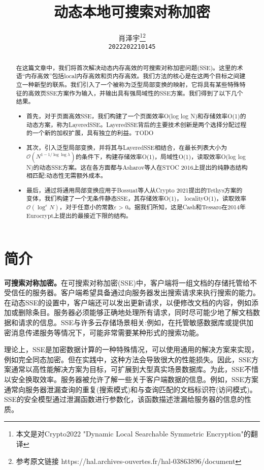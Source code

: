 \documentclass[UTF8]{article}
\title{动态本地可搜索对称加密}
\author{%
  肖泽宇\thanks{本文是对Crypto2022 "Dynamic Local Searchable Symmetric Encryption"的翻译}\thanks{参考原文链接 https://hal.archives-ouvertes.fr/hal-03863896/document} \\
  \texttt{2022202210145} \\
}
\begin{document}
\maketitle


\begin{abstract}
  在这篇文章中，我们将首次解决动态内存高效的可搜索对称加密问题(SSE)。这里的术语“内存高效”包括local内存高效和页内存高效。我们方法的核心是在这两个目标之间建立一种新型的联系。我们引入了一个被称为泛型局部变换的映射，它将具有某些特殊特征的高效页SSE方案作为输入，并输出具有强局域性的SSE方案。我们得到了以下几个结果。
  \begin{itemize}
    \item 首先，对于页面高效SSE，我们构建了一个页面效率O(log log N)和存储效率O(1)的动态方案，称为LayeredSSE。LayeredSSE背后的主要技术创新是两个选择分配过程的一个新的加权扩展，具有独立的利益。TODO
    \item 其次，引入泛型局部变换，并将其与LayeredSSE相结合，在最长列表大小为$\mathcal{O}\left(N^{1-1 / \log \log \lambda}\right)$的条件下，构建存储效率O(1)，局域性O(1)，读取效率O(log log N)的动态SSE方案。这在各方面都与Asharov等人在STOC 2016上提出的纯静态结构相匹配:动态性无需额外成本。
    \item 最后，通过将通用局部变换应用于Bossuat等人从Crypto 2021提出的Tethys方案的变体，我们构建了一个无条件静态SSE，其存储效率O(1)， localityO(1)，读取效率$\mathcal{O}\left(\log ^{\varepsilon} N\right)$，对于任意小的常数$\varepsilon$ > 0。据我们所知，这是Cash和Tessaro在2014年Eurocrypt上提出的最接近下限的结构。
  \end{itemize}
\end{abstract}


\section{简介}
\textbf{可搜索对称加密。}在可搜索对称加密(SSE)中，客户端将一组文档的存储托管给不受信任的服务器。客户端希望具备通过向服务器发出搜索请求来执行搜索的能力。在动态SSE的设置中，客户端还可以发出更新请求，以便修改文档的内容，例如添加或删除条目。服务器必须能够正确地处理所有请求，同时尽可能少地了解文档数据和请求的信息。SSE与许多云存储场景相关:例如，在托管敏感数据库或提供加密消息传递服务等情况下，可能非常需要某种形式的搜索功能。

理论上，SSE是加密数据计算的一种特殊情况，可以使用通用的解决方案来实现，例如完全同态加密。但在实践中，这种方法会导致很大的性能损失。因此，SSE方案通常以高性能解决方案为目标，可扩展到大型真实场景数据库。为此，SSE不惜以安全换取效率。服务器被允许了解一些关于客户端数据的信息。例如，SSE方案通常向服务器泄漏查询的重复(搜索模式)和与查询匹配的文档标识符(访问模式)。SSE的安全模型通过泄漏函数进行参数化，该函数描述泄漏给服务器的信息的性质。
\end{document}
